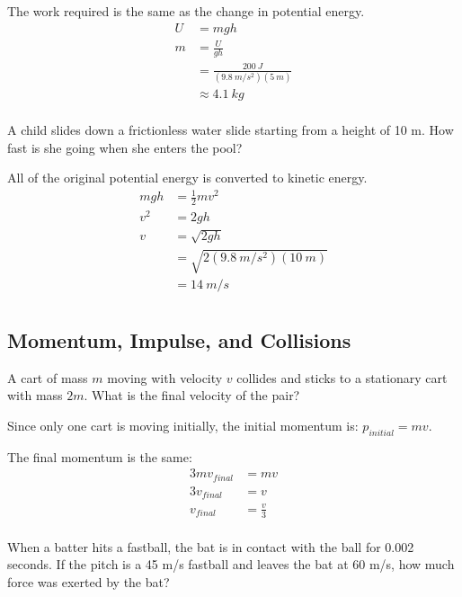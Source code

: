 \documentclass[fleqn,addpoints]{exam}
\begin{document}
\begin{questions}
\begin{solution}
The work required is the same as the change in potential energy.
\begin{align*}
  U &= mgh \\
  m &= \frac{U}{gh} \\
    &= \frac{200 \ J}{(9.8 \ m/s^2)(5 \ m)} \\
    &\approx 4.1 \ kg \\
\end{align*}

\end{solution}

\question[5]
A child slides down a frictionless water slide starting from a height of 10 m.  How fast is she going when she enters the pool?

\begin{solution}
All of the original potential energy is converted to kinetic energy.
\begin{align*}
  mgh &= \frac{1}{2} mv^2 \\
  v^2 &= 2gh \\
  v   &= \sqrt{2gh} \\
      &= \sqrt{2 (9.8 \ m/s^2)(10 \ m)} \\
      &= 14 \ m/s \\
\end{align*}

\end{solution}

\subsection{Momentum, Impulse, and Collisions}

\question[5]
A cart of mass $m$ moving with velocity $v$ collides and sticks to a stationary cart with mass $2m$.  What is the final
velocity of the pair?

\begin{solution}
Since only one cart is moving initially, the initial momentum is: $p_{initial} = mv$.

The final momentum is the same:
\begin{align*}
  3mv_{final} &= mv \\
  3v_{final} &= v \\
  v_{final} &= \frac{v}{3} \\   
\end{align*}

\end{solution}

\question[5] When a batter hits a fastball, the bat is in contact with the ball for
0.002 seconds.  If the pitch is a 45 m/s fastball and leaves the bat at 60 m/s,
how much force was exerted by the bat?


\end{questions}
\end{document}
